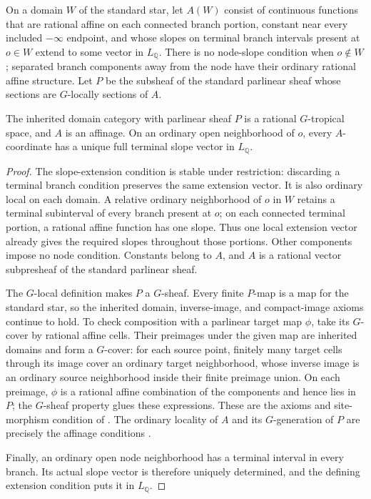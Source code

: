 On a domain $W$ of the standard star, let $A(W)$ consist of continuous functions that are rational affine on each connected branch portion, constant near every included $-\infty$ endpoint, and whose slopes on terminal branch intervals present at $o\in W$ extend to some vector in $L_{\mathbb Q}$. There is no node-slope condition when $o\notin W$; separated branch components away from the node have their ordinary rational affine structure. Let $P$ be the subsheaf of the standard parlinear sheaf whose sections are $G$-locally sections of $A$.

\begin{lemma}\label{lem:supplied-p071b-site-inheritance}
The inherited domain category with parlinear sheaf $P$ is a rational $G$-tropical space, and $A$ is an affinage. On an ordinary open neighborhood of $o$, every $A$-coordinate has a unique full terminal slope vector in $L_{\mathbb Q}$.
\end{lemma}

\begin{proof}
The slope-extension condition is stable under restriction: discarding a terminal branch condition preserves the same extension vector. It is also ordinary local on each domain. A relative ordinary neighborhood of $o$ in $W$ retains a terminal subinterval of every branch present at $o$; on each connected terminal portion, a rational affine function has one slope. Thus one local extension vector already gives the required slopes throughout those portions. Other components impose no node condition. Constants belong to $A$, and $A$ is a rational vector subpresheaf of the standard parlinear sheaf.

The $G$-local definition makes $P$ a $G$-sheaf. Every finite $P$-map is a map for the standard star, so the inherited domain, inverse-image, and compact-image axioms continue to hold. To check composition with a parlinear target map $\phi$, take its $G$-cover by rational affine cells. Their preimages under the given map are inherited domains and form a $G$-cover: for each source point, finitely many target cells through its image cover an ordinary target neighborhood, whose inverse image is an ordinary source neighborhood inside their finite preimage union. On each preimage, $\phi$ is a rational affine combination of the components and hence lies in $P$; the $G$-sheaf property glues these expressions. These are the axioms and site-morphism condition of \cite[\S\S3.1.2--3.1.4]{CLD25}. The ordinary locality of $A$ and its $G$-generation of $P$ are precisely the affinage conditions \cite[\S\S6.1.1--6.1.2]{CLD25}.

Finally, an ordinary open node neighborhood has a terminal interval in every branch. Its actual slope vector is therefore uniquely determined, and the defining extension condition puts it in $L_{\mathbb Q}$.
\end{proof}

